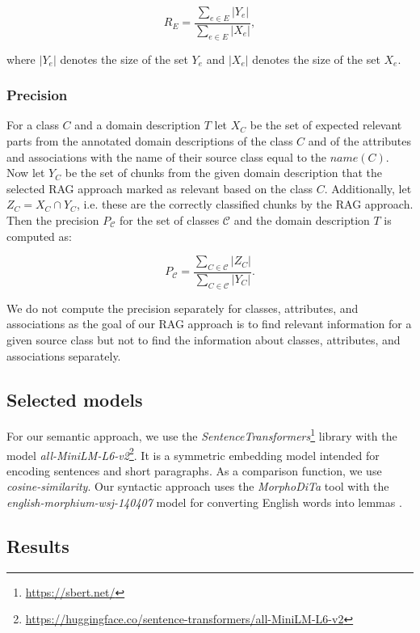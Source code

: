 \[ R_E = \dfrac{\sum_{e \in E}|Y_e|}{\sum_{e \in E}|X_e|}, \]

\noindent{}where $|Y_e|$ denotes the size of the set $Y_e$ and $|X_e|$ denotes the size of the set $X_e$.


\subsubsection{Precision}

For a class $C$ and a domain description $T$ let $X_{C}$ be the set of expected relevant parts from the annotated domain descriptions of the class $C$ and of the attributes and associations with the name of their source class equal to the $name(C)$. Now let $Y_{C}$ be the set of chunks from the given domain description that the selected RAG approach marked as relevant based on the class $C$. Additionally, let $Z_C = X_C \cap Y_C$, i.e. these are the correctly classified chunks by the RAG approach.
Then the precision $P_{\mathcal{C}}$ for the set of classes $\mathcal{C}$ and the domain description $T$ is computed as:

\[ P_{\mathcal{C}} = \dfrac{\sum_{C \in \mathcal{C}}|Z_C|}{\sum_{C \in \mathcal{C}}|Y_C|}. \]

We do not compute the precision separately for classes, attributes, and associations as the goal of our RAG approach is to find relevant information for a given source class but not to find the information about classes, attributes, and associations separately.


\subsection{Selected models}

For our semantic approach, we use the \textit{SentenceTransformers}\footnote{\url{https://sbert.net/}} library with the model \textit{all-MiniLM-L6-v2}\footnote{\url{https://huggingface.co/sentence-transformers/all-MiniLM-L6-v2}}. It is a symmetric embedding model intended for encoding sentences and short paragraphs. As a comparison function, we use \textit{cosine-similarity}. Our syntactic approach uses the \textit{MorphoDiTa} tool \cite{Strakova2014} with the \textit{english-morphium-wsj-140407} model for converting English words into lemmas \cite{Straka2014}.


\subsection{Results}

